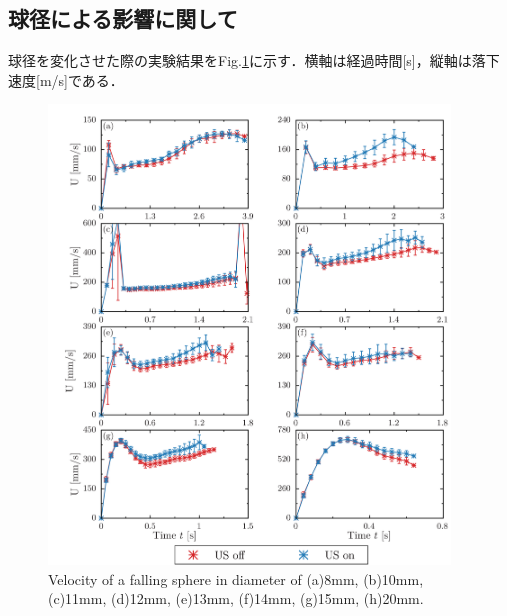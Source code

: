 \clearpage

\subsection{球径による影響に関して}

球径を変化させた際の実験結果をFig.\ref{fig:diameter}に示す．横軸は経過時間[s]，縦軸は落下速度[m/s]である．

\begin{figure}[h]
    \centering
    \includegraphics[width=0.95\textwidth]{X-Appendix/diameter/diameter.png}
    \caption{Velocity of a falling sphere in diameter of (a)8mm, (b)10mm, (c)11mm, (d)12mm, (e)13mm, (f)14mm, (g)15mm, (h)20mm.} %
    \label{fig:diameter}
\end{figure}
